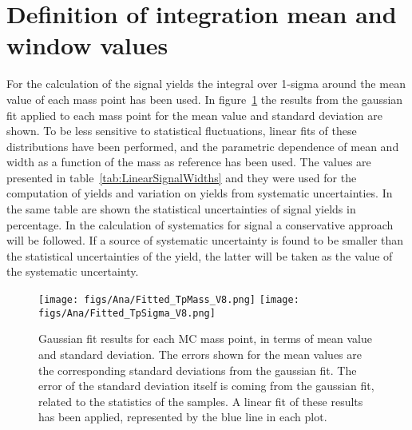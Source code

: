 \section{Definition of integration mean and window values}
\label{sec:DefSigma}

For the calculation of the signal yields the integral over 1-sigma around the mean value of each mass point has been used. In figure~\ref{fig:LinearFitMeanSigma} the results from the gaussian fit applied to each mass point for the mean value and standard deviation are shown. To be less sensitive to statistical fluctuations, linear fits of these distributions have been performed, and the parametric dependence of mean and width as a function of the mass as reference has been used. The values are presented in table~\ref{tab:LinearSignalWidths} and they were used for the computation of yields and variation on yields from systematic uncertainties. In the same table are shown the statistical uncertainties of signal yields in percentage. In the calculation of systematics for signal a conservative approach will be followed. If a source of systematic uncertainty is found to be smaller than the statistical uncertainties of the yield, the latter will be taken as the value of the systematic uncertainty.

\begin{figure}[!Hhtbp]
  \begin{center}
    \texttt{[image: figs/Ana/Fitted\_TpMass\_V8.png]}
    \texttt{[image: figs/Ana/Fitted\_TpSigma\_V8.png]}
    \caption{Gaussian fit results for each MC mass point, in terms of mean value and standard deviation. The errors shown for the mean values are the corresponding standard deviations from the gaussian fit. The error of the standard deviation itself is coming from the gaussian fit, related to the statistics of the samples. A linear fit of these results has been applied, represented by the blue line in each plot.}
    \label{fig:LinearFitMeanSigma}
  \end{center}
\end{figure}

